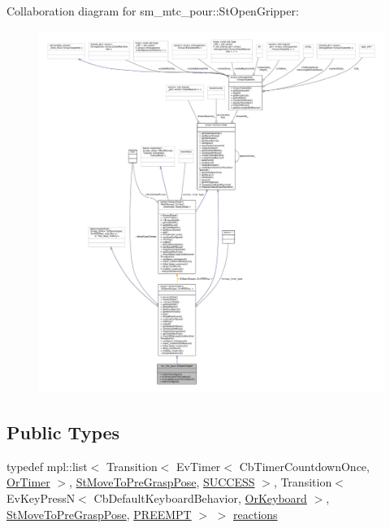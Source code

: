 Collaboration diagram for sm\+\_\+mtc\+\_\+pour\+:\+:St\+Open\+Gripper\+:
\nopagebreak
\begin{figure}[H]
\begin{center}
\leavevmode
\includegraphics[width=350pt]{structsm__mtc__pour_1_1StOpenGripper__coll__graph}
\end{center}
\end{figure}
\subsection*{Public Types}
\begin{DoxyCompactItemize}
\item 
typedef mpl\+::list$<$ Transition$<$ Ev\+Timer$<$ Cb\+Timer\+Countdown\+Once, \hyperlink{classsm__mtc__pour_1_1OrTimer}{Or\+Timer} $>$, \hyperlink{structsm__mtc__pour_1_1StMoveToPreGraspPose}{St\+Move\+To\+Pre\+Grasp\+Pose}, \hyperlink{classSUCCESS}{S\+U\+C\+C\+E\+SS} $>$, Transition$<$ Ev\+Key\+PressN$<$ Cb\+Default\+Keyboard\+Behavior, \hyperlink{classsm__mtc__pour_1_1OrKeyboard}{Or\+Keyboard} $>$, \hyperlink{structsm__mtc__pour_1_1StMoveToPreGraspPose}{St\+Move\+To\+Pre\+Grasp\+Pose}, \hyperlink{classPREEMPT}{P\+R\+E\+E\+M\+PT} $>$ $>$ \hyperlink{structsm__mtc__pour_1_1StOpenGripper_a266653b0981abb6733b2aa08b4d343ad}{reactions}
\end{DoxyCompactItemize}
